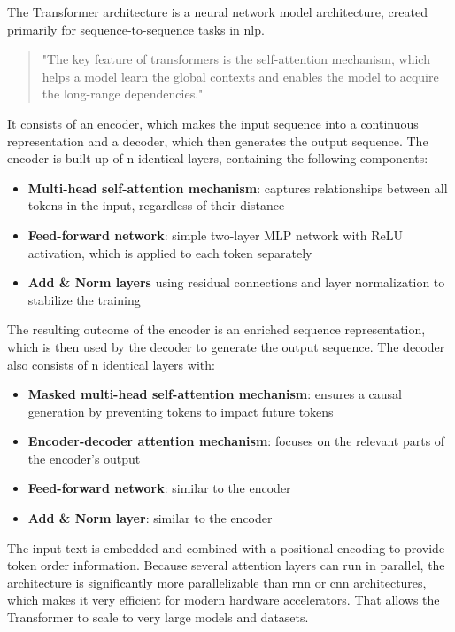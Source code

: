 \documentclass[conference]{IEEEtran}
\begin{document}
  The Transformer architecture is a neural network model architecture, created primarily for sequence-to-sequence tasks in \ac{nlp}. 
  \begin{quote}
    "The key feature of transformers is the self-attention mechanism, which helps a model learn the global contexts and enables the model to acquire the long-range dependencies." \cite{vit-state-challenges}
  \end{quote}
  It consists of an encoder, which makes the input sequence into a continuous representation and a decoder, which then generates the output sequence. The encoder is built up of n identical layers, containing the following components:
  \begin{itemize}
    \item \textbf{Multi-head self-attention mechanism}: captures relationships between all tokens in the input, regardless of their distance
    \item \textbf{Feed-forward network}: simple two-layer MLP network with ReLU activation, which is applied to each token separately
    \item \textbf{Add \& Norm layers} using residual connections and layer normalization to stabilize the training
  \end{itemize}
  The resulting outcome of the encoder is an enriched sequence representation, which is then used by the decoder to generate the output sequence. The decoder also consists of n identical layers with:
  \begin{itemize}
    \item \textbf{Masked multi-head self-attention mechanism}: ensures a causal generation by preventing tokens to impact future tokens
    \item \textbf{Encoder-decoder attention mechanism}: focuses on the relevant parts of the encoder's output
    \item \textbf{Feed-forward network}: similar to the encoder
    \item \textbf{Add \& Norm layer}: similar to the encoder
  \end{itemize}
  The input text is embedded and combined with a positional encoding to provide token order information. Because several attention layers can run in parallel, the architecture is significantly more parallelizable than \ac{rnn} or \ac{cnn} architectures, which makes it very efficient for modern hardware accelerators. That allows the Transformer to scale to very large models and datasets. \cite{transformer2017}
\end{document}
